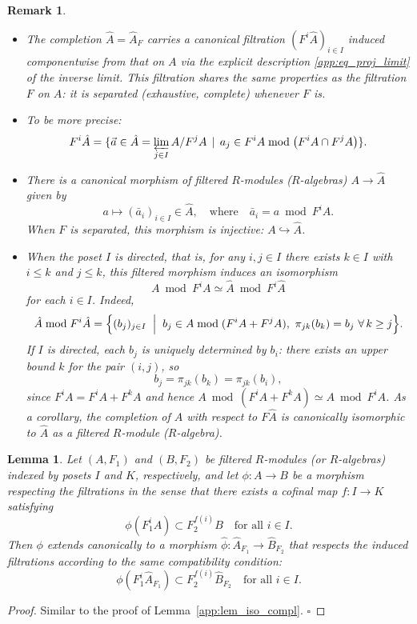 \documentclass[a4paper,12pt]{amsart}
\newtheorem{lemma}{Lemma}
\newtheorem{rem}{Remark}
\begin{document}
\begin{rem}\normalfont{\mbox{}\vskip 2mm}\label{app:rem_completion_filtration}
\begin{itemize}
    \item The completion $\hat{A}=\hat{A}_F$ carries a canonical filtration
    \( \left(F^i\hat{A}\right)_{i\in I}\)
    induced componentwise from that on $A$ via the explicit description \eqref{app:eq_proj_limit} of the inverse limit. This filtration shares the same properties as the filtration \(F\) on \(A\): it is separated (exhaustive, complete) whenever \(F\) is.
    \item To be more precise:
    \begin{equation*}
        F^i\hat{A}=\{\vec{a}\in\hat{A}=\varprojlim_{j\in I} A/F^j A\,\mid\, a_j\in F^iA \bmod
        \left(F^iA \cap F^j A\right)\}.
    \end{equation*}
    \item There is a canonical morphism of filtered $R$-modules ($R$-algebras) $A\to\hat{A}$ given by
\[
a\mapsto(\bar{a}_i)_{i\in I}\in\hat{A}, \quad\text{where}\quad\bar{a}_i=a\bmod F^iA.
\]
When $F$ is separated, this morphism is injective: \(A\hookrightarrow  \hat{A} \).
\item When the poset \(I\) is \emph{directed}, that is, for any \(i,j \in I\) there exists \(k \in I\) with \(i \le k\) and \(j \le k\), this filtered morphism induces an isomorphism
\[
A \bmod F^i A \simeq \hat{A} \bmod F^i \hat{A}
\]
for each \(i \in I\).
Indeed,
\[
\hat{A} \bmod F^i \hat{A} = \Bigl\{ (b_j)_{j \in I} \;\Bigm|\; b_j \in A \bmod (F^i A + F^j A),\ \pi_{jk}(b_k) = b_j\ \forall\, k \ge j \Bigr\}.
\]
If \(I\) is directed, each \(b_j\) is uniquely determined by \(b_i\): there exists an upper bound \(k\) for the pair \((i,j)\), so
\[
b_j = \pi_{jk}(b_k) = \pi_{jk}(b_i),
\]
since \(F^i A = F^i A + F^k A\) and hence \(A \bmod (F^i A + F^k A) \simeq A \bmod F^i A\).
As a corollary, the completion of $A$ with respect to $F\hat{A}$ is canonically isomorphic to $\hat{A}$ as a filtered $R$-module ($R$-algebra).
\end{itemize}
   \end{rem}




\begin{lemma}\label{app:lem_morphism_completion}\normalfont
Let $(A,F_1)$ and $(B,F_2)$ be filtered $R$-modules (or $R$-algebras) indexed by posets $I$ and $K$, respectively, and let $\phi\colon A\to B$ be a morphism respecting the filtrations in the sense that there exists a cofinal map $f\colon I\to K$ satisfying
\[
\phi\left(F_1^i A\right) \subset F_2^{f(i)} B \quad \text{for all } i\in I.
\]
Then $\phi$ extends canonically to a morphism $\hat{\phi}\colon \hat{A}_{F_1}\to \hat{B}_{F_2}$ that respects the induced filtrations according to the same compatibility condition:
\[
\phi\left(F_1^i \hat{A}_{F_1}\right) \subset F_2^{f(i)} \hat{B}_{F_2} \quad \text{for all } i\in I.
\]
\end{lemma}
\noindent
\begin{proof}
Similar to the proof of Lemma~\ref{app:lem_iso_compl}.
    $\square$
\end{proof}
\end{document}
